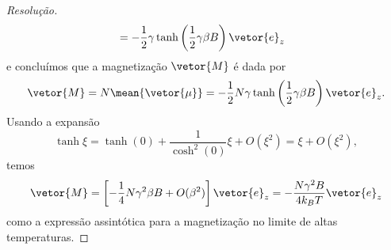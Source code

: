 \begin{proof}[Resolução]
\begin{align*}
      &= - \frac12 \gamma \tanh\left(\frac12 \gamma \beta B\right)\vetor{e}_z
   \end{align*}
   e concluímos que a magnetização \(\vetor{M}\) é dada por
   \begin{equation*}
      \vetor{M} = N \mean{\vetor{\mu}} = -\frac12 N \gamma \tanh\left(\frac12 \gamma \beta B\right) \vetor{e}_z.
   \end{equation*}
   Usando a expansão
   \begin{equation*}
      \tanh \xi = \tanh(0) + \frac{1}{\cosh^2(0)} \xi + O(\xi^2) = \xi + O(\xi^2),
   \end{equation*}
   temos
   \begin{equation*}
      \vetor{M} = \left[- \frac14 N \gamma^2 \beta B + O(\beta^2)\right]\vetor{e}_z = - \frac{N \gamma^2 B}{4 k_B T}\vetor{e}_z
   \end{equation*}
   como a expressão assintótica para a magnetização no limite de altas temperaturas.
\end{proof}
